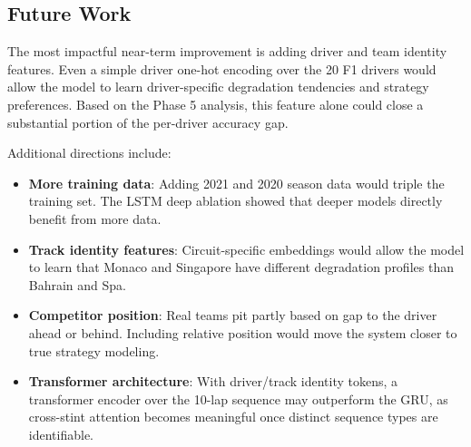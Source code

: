 \subsection{Future Work}

The most impactful near-term improvement is adding driver and team identity features. Even a simple driver one-hot encoding over the 20 F1 drivers would allow the model to learn driver-specific degradation tendencies and strategy preferences. Based on the Phase 5 analysis, this feature alone could close a substantial portion of the per-driver accuracy gap.

Additional directions include:
\begin{itemize}[noitemsep]
    \item \textbf{More training data}: Adding 2021 and 2020 season data would triple the training set. The LSTM deep ablation showed that deeper models directly benefit from more data.
    \item \textbf{Track identity features}: Circuit-specific embeddings would allow the model to learn that Monaco and Singapore have different degradation profiles than Bahrain and Spa.
    \item \textbf{Competitor position}: Real teams pit partly based on gap to the driver ahead or behind. Including relative position would move the system closer to true strategy modeling.
    \item \textbf{Transformer architecture}: With driver/track identity tokens, a transformer encoder \cite{vaswani2017} over the 10-lap sequence may outperform the GRU, as cross-stint attention becomes meaningful once distinct sequence types are identifiable.
\end{itemize}
